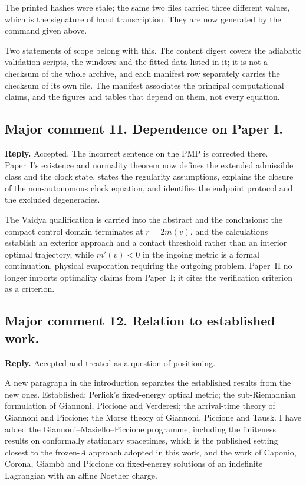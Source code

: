 \documentclass{article}
\begin{document}
The printed hashes were stale; the same two files carried three different values,
which is the signature of hand transcription. They are now generated by the command
given above.

Two statements of scope belong with this. The content digest covers the adiabatic
validation scripts, the windows and the fitted data listed in it; it is not a
checksum of the whole archive, and each manifest row separately carries the checksum
of its own file. The manifest associates the principal computational claims, and the
figures and tables that depend on them, not every equation.

\subsection{Major comment 11. Dependence on Paper I.}
\textbf{Reply.} Accepted. The incorrect sentence on the PMP is corrected there.
Paper~I's existence and normality theorem now defines the extended admissible class
and the clock state, states the regularity assumptions, explains the closure of the
non-autonomous clock equation, and identifies the endpoint protocol and the excluded
degeneracies.

The Vaidya qualification is carried into the abstract and the conclusions: the
compact control domain terminates at \(r=2m(v)\), and the calculations establish an
exterior approach and a contact threshold rather than an interior optimal
trajectory, while \(m'(v)<0\) in the ingoing metric is a formal continuation,
physical evaporation requiring the outgoing problem. Paper~II no longer imports
optimality claims from Paper~I; it cites the verification criterion as a criterion.

\subsection{Major comment 12. Relation to established work.}
\textbf{Reply.} Accepted and treated as a question of positioning.

A new paragraph in the introduction separates the established results from the new
ones. Established: Perlick's fixed-energy optical metric; the sub-Riemannian
formulation of Giannoni, Piccione and Verderesi; the arrival-time theory of Giannoni
and Piccione; the Morse theory of Giannoni, Piccione and Tausk. I have added the
Giannoni--Masiello--Piccione programme, including the finiteness results on
conformally stationary spacetimes, which is the published setting closest to the
frozen-\(A\) approach adopted in this work, and the work of Caponio, Corona, Giamb\`o
and Piccione on fixed-energy solutions of an indefinite Lagrangian with an affine
Noether charge.
\end{document}
